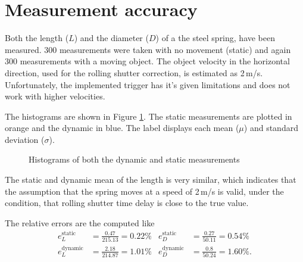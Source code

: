 \section{Measurement accuracy}
Both the length ($L$) and the diameter ($D$) of a the steel spring, have been measured.
300 measurements were taken with no movement (static) and again 300 measurements with a moving object.
The object velocity in the horizontal direction, used for the rolling shutter correction, is estimated as 2\,m/s.
Unfortunately, the implemented trigger has it's given limitations and does not work with higher velocities.

The histograms are shown in Figure \ref{development:hist}.
The static measurements are plotted in orange and the dynamic in blue.
The label displays each mean ($\mu$) and standard deviation ($\sigma$).
\begin{figure}[ht]
	\centering
	\caption{Histograms of both the dynamic and static measurements\label{development:hist}}		
\end{figure}
The static and dynamic mean of the length is very similar, which indicates that the assumption that the spring moves at a speed of 2\,m/s is valid, under the condition, that rolling shutter time delay is close to the true value.

The relative errors are the computed like
\begin{align*}
	e_{L}^{\text{static}}&=\frac{0.47}{215.13}=0.22\%&e_D^{\text{static}}&=\frac{0.27}{50.11}=0.54\%\\
	e_{L}^{\text{dynamic}}&=\frac{2.18}{214.87}=1.01\%&e_D^{\text{dynamic}}&=\frac{0.8}{50.24}=1.60\%.
\end{align*}

